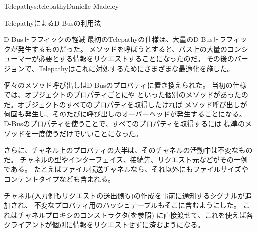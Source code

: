 \begin{aosachapter}{Telepathy}{s:telepathy}{Danielle Madeley}
\begin{aosasect1}{TelepathyによるD-Busの利用法}
\begin{aosasect2}{D-Busトラフィックの軽減}
最初のTelepathyの仕様は、大量のD-Busトラフィックが発生するものだった。
メソッドを呼ぼうとすると、バス上の大量のコンシューマーが必要とする情報をリクエストすることになったのだ。
その後のバージョンで、Telepathyはこれに対処するためにさまざまな最適化を施した。

個々のメソッド呼び出しはD-Busのプロパティに置き換えられた。
当初の仕様では、オブジェクトのプロパティごとにや
といった個別のメソッドがあったのだ。オブジェクトのすべてのプロパティを取得したければ
メソッド呼び出しが何回も発生し、そのたびに呼び出しのオーバーヘッドが発生することになる。
D-Busのプロパティを使うことで、すべてのプロパティを取得するには
標準のメソッドを一度使うだけでいいことになった。

さらに、チャネル上のプロパティの大半は、そのチャネルの活動中は不変なものだ。
チャネルの型やインターフェイス、接続先、リクエスト元などがその一例である。
たとえばファイル転送チャネルなら、それ以外にもファイルサイズやコンテントタイプなども含まれる。

チャネル(入力側もリクエストの送出側も)の作成を事前に通知するシグナルが追加され、
不変なプロパティ用のハッシュテーブルもそこに含むようにした。
これはチャネルプロキシのコンストラクタ(を参照)
に直接渡せて、これを使えば各クライアントが個別に情報をリクエストせずに済むようになる。


\end{aosasect2}
\end{aosasect1}
\end{aosachapter}
